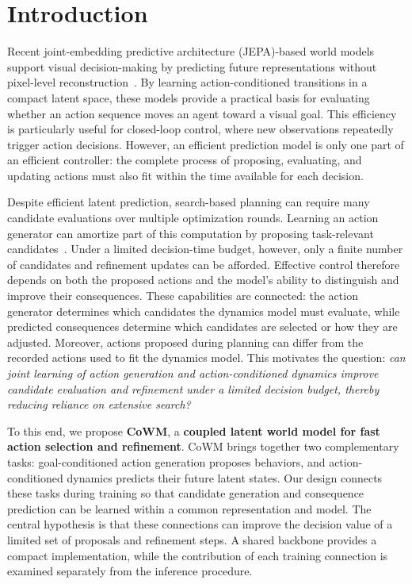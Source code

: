 \section{Introduction}
\label{sec:introduction}

Recent joint-embedding predictive architecture (JEPA)-based world models support visual decision-making by predicting future representations without pixel-level reconstruction~\cite{zhou2024dinowm,maes2026lewm}. By learning action-conditioned transitions in a compact latent space, these models provide a practical basis for evaluating whether an action sequence moves an agent toward a visual goal. This efficiency is particularly useful for closed-loop control, where new observations repeatedly trigger action decisions. However, an efficient prediction model is only one part of an efficient controller: the complete process of proposing, evaluating, and updating actions must also fit within the time available for each decision.

Despite efficient latent prediction, search-based planning can require many candidate evaluations over multiple optimization rounds. Learning an action generator can amortize part of this computation by proposing task-relevant candidates~\cite{huang2026leflow,hamel2026flowmpc}. Under a limited decision-time budget, however, only a finite number of candidates and refinement updates can be afforded. Effective control therefore depends on both the proposed actions and the model's ability to distinguish and improve their consequences. These capabilities are connected: the action generator determines which candidates the dynamics model must evaluate, while predicted consequences determine which candidates are selected or how they are adjusted. Moreover, actions proposed during planning can differ from the recorded actions used to fit the dynamics model. This motivates the question: \emph{can joint learning of action generation and action-conditioned dynamics improve candidate evaluation and refinement under a limited decision budget, thereby reducing reliance on extensive search?}

To this end, we propose \textbf{CoWM}, a \textbf{coupled latent world model for fast action selection and refinement}. CoWM brings together two complementary tasks: goal-conditioned action generation proposes behaviors, and action-conditioned dynamics predicts their future latent states. Our design connects these tasks during training so that candidate generation and consequence prediction can be learned within a common representation and model. The central hypothesis is that these connections can improve the decision value of a limited set of proposals and refinement steps. A shared backbone provides a compact implementation, while the contribution of each training connection is examined separately from the inference procedure.

